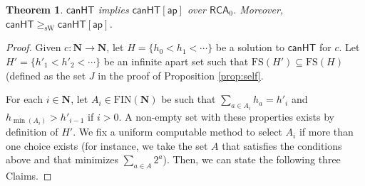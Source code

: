 \documentclass[a4paper,11pt]{article}
\newtheorem{theorem}{Theorem}
\newcommand\Nat{\mathbf{N}}
\newcommand\RCA{\mathsf{RCA}}
\newcommand\RT{\mathsf{RT}}
\newcommand\canHT{\mathsf{canHT}}
\newcommand\FIN{\mathrm{FIN}}
\newcommand\FS{\mathrm{FS}}
\newcommand\sW{\mathrm{sW}}
\newcommand\ap{\mathsf{ap}}
\begin{document}
\begin{theorem}\label{thm:canap}
$\canHT$ implies $\canHT[\ap]$ over $\RCA_0$.  Moreover, $\canHT\geq_\sW \canHT[\ap]$.
\end{theorem}

\begin{proof}
Given $c: \Nat \to \Nat$, let $H = \{h_0 < h_1 < \cdots \}$ be a solution to $\canHT$ for $c$.
Let $H' = \{ h'_1 < h'_2 < \cdots \}$ be an infinite apart set such that $\FS(H') \subseteq \FS(H)$ (defined as the set $J$ in the proof of Proposition \ref{prop:self}.

For each $i \in \Nat$, let $A_i \in \FIN(\Nat)$ be such that $\sum_{a \in A_i} h_a = h'_i$  and $h_{\min(A_i)} > h'_{i-1}$ if $i>0$. A non-empty set with these properties exists by definition of $H'$. We fix a uniform computable method to select $A_i$ if more than one choice exists (for instance, we take the set $A$ that satisfies the conditions above and that minimizes $\sum_{a \in A} 2^a$). Then, we can state the following three Claims.


\end{proof}
\end{document}
